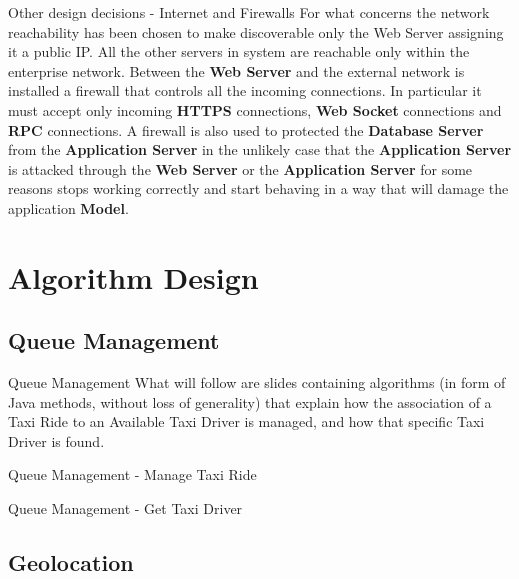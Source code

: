 \documentclass{../common/latex_classes/pdf_presentation}
\begin{document}
	
	\begin{frame}{Other design decisions - Internet and Firewalls}
		For what concerns the network reachability has been chosen to make discoverable only the Web Server assigning it a public IP.
		All the other servers in \myTaxiService{} system are reachable only within the enterprise network.
		Between the \textbf{Web Server} and the external network is installed a firewall that controls all the incoming connections.
		In particular it must accept only incoming \textbf{HTTPS} connections, \textbf{Web Socket} connections and \textbf{RPC} connections.
		A firewall is also used to protected the \textbf{Database Server} from the \textbf{Application Server} in the unlikely case that the \textbf{Application Server} is attacked through the \textbf{Web Server} or the \textbf{Application Server} for some reasons stops working correctly and start behaving in a way that will damage the application \textbf{Model}.
	\end{frame}
	
	
	\section{Algorithm Design}

	\subsection{Queue Management}
	\configureJava{}
	\begin{frame}{Queue Management}
		What will follow are slides containing algorithms (in form of Java methods, without loss of generality) that explain how the association of a Taxi Ride to an Available Taxi Driver is managed, and how that specific Taxi Driver is found.
	\end{frame}
	
	\begin{frame}{Queue Management - Manage Taxi Ride}
		
		
	\end{frame}
	
	\begin{frame}{Queue Management - Get Taxi Driver}
		
	\end{frame}
	
	\subsection{Geolocation}
	
\end{document}
